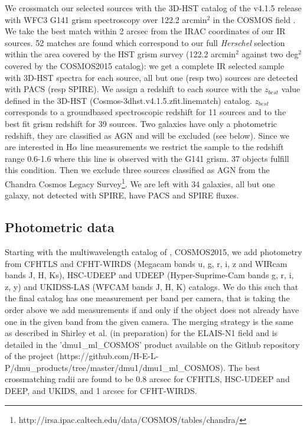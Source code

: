 \documentclass{aa}
\begin{document}
We crossmatch our selected sources with the 3D-HST  catalog of the v4.1.5 release  with WFC3 G141 grism spectroscopy  over 122.2 arcmin$^2$ in the COSMOS field \citep{Momcheva16, Brammer12}.  We take  the best match within 2 arcsec from the  IRAC coordinates of our IR sources. 52 matches are found which correspond to our full {\it Herschel}  selection  within the area covered by the  HST grism survey (122.2 arcmin$^2$ against two  deg$^2$ covered by the COSMOS2015 catalog):  we get a complete IR selected sample with 3D-HST spectra for each source, all but one (resp two) sources are detected with PACS (resp SPIRE). We assign a redshift to each source with the $z_{best}$ value defined in the 3D-HST  (Cosmos-3dhst.v4.1.5.zfit.linematch) catalog. $z_{best}$ corresponds to a groundbased spectroscopic redshift for 11 sources and  to the best fit grism redshift for 39 sources. Two  galaxies have only a photometric redshift,  they are classified as AGN and will be excluded (see below). Since we are interested in H$\alpha$ line measurements we restrict the sample to the redshift range 0.6-1.6 where this line is observed with the G141 grism. 37 objects fulfill this condition. Then we exclude three  sources classified as AGN from the Chandra  Cosmos Legacy Survey\footnote{http://irsa.ipac.caltech.edu/data/COSMOS/tables/chandra/}. We are left with 34 galaxies, all but one galaxy, not detected with SPIRE, have PACS and SPIRE fluxes.


\subsection{Photometric data}
Starting with  the multiwavelength catalog of  \citet{Laigle16}, COSMOS2015, we add photometry from CFHTLS and  CFHT-WIRDS (Megacam bands u, g, r, i, z and WIRcam bands J, H, Ks), HSC-UDEEP and UDEEP (Hyper-Suprime-Cam bands g, r, i, z, y) and UKIDSS-LAS  (WFCAM bands J, H, K)  catalogs. We do this such that the final catalog  has one measurement per band per camera, that is   taking the order above we add measurements if and only if the object does not already have one in the given band from the given camera. The merging strategy is the same as described in Shirley et al. (in preparation) for the ELAIS-N1 field and is detailed in the 'dmu1\_ml\_COSMOS' product available on the Github repository of the project (https://github.com/H-E-L-P/dmu\_products/tree/master/dmu1/dmu1\_ml\_COSMOS). The best crossmatching radii are found to be 0.8 arcsec for CFHTLS, HSC-UDEEP and DEEP, and UKIDS, and 1 arcsec for CFHT-WIRDS. 
\end{document}
